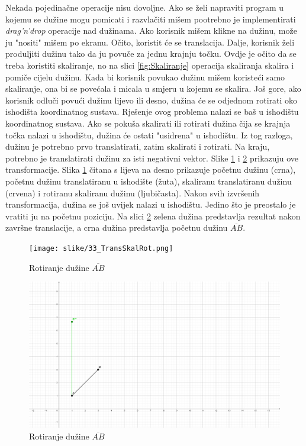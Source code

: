 \documentclass{foi}
\begin{document}
Nekada pojedinačne operacije nisu dovoljne. Ako se želi napraviti program u kojemu se dužine mogu pomicati i razvlačiti mišem pootrebno je implementirati \textit{drag'n'drop} operacije nad dužinama. Ako korisnik mišem klikne na dužinu, može ju "nositi" mišem po ekranu. Očito, koristit će se translacija. Dalje, korisnik želi produljiti dužinu tako da ju povuče za jednu krajnju točku. Ovdje je očito da se treba koristiti skaliranje, no na slici \ref{fig:Skaliranje} operacija skaliranja skalira i pomiče cijelu dužinu. Kada bi korisnik povukao dužinu mišem  koristeći samo skaliranje, ona bi se povećala i micala u smjeru u kojemu se skalira. Još gore, ako korisnik odluči povući dužinu lijevo ili desno, dužina će se odjednom rotirati oko ishodišta koordinatnog sustava. Rješenje ovog problema nalazi se baš u ishodištu koordinatnog sustava. Ako se pokuša skalirati ili rotirati dužina čija se krajnja točka nalazi u ishodištu, dužina će ostati "usidrena" u ishodištu. Iz tog razloga, dužinu je potrebno prvo translatirati, zatim skalirati i rotirati. Na kraju, potrebno je translatirati dužinu za isti negativni vektor. Slike \ref{fig:TransSkalRot} i \ref{fig:TransSkalRotKraj} prikazuju ove transformacije. Slika \ref{fig:TransSkalRot} čitana s lijeva na desno prikazuje početnu dužinu (crna), početnu dužinu translatiranu u ishodište (žuta), skaliranu translatiranu dužinu (crvena) i rotiranu skaliranu dužinu (ljubičasta). Nakon svih izvršenih transformacija, dužina se još uvijek nalazi u ishodištu. Jedino što je preostalo je vratiti ju na početnu poziciju. Na slici \ref{fig:TransSkalRotKraj} zelena dužina predstavlja rezultat nakon završne translacije, a crna dužina predstavlja početnu dužinu $\overline{AB}$. 


\begin{figure}[H]
	\centering
	\texttt{[image: slike/33\_TransSkalRot.png]}
	\captionsetup{justification=centering}
	\caption{Rotiranje dužine $\overline{AB}$}
	\label{fig:TransSkalRot}
\end{figure}
\begin{figure}[H]
	\centering
	\includegraphics[width=1\textwidth]{slike/34_TransSkalRotKRAJ.png}
	\captionsetup{justification=centering}
	\caption{Rotiranje dužine $\overline{AB}$}
	\label{fig:TransSkalRotKraj}
\end{figure}
\end{document}
